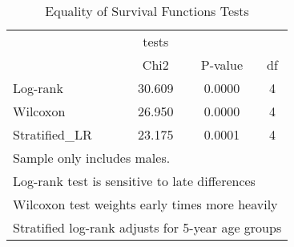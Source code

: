 \begin{table}[htbp]\centering
\caption{Equality of Survival Functions Tests}
\begin{tabular}{l*{3}{c}}
\hline\hline
            &       tests&            &            \\
            &        Chi2&     P-value&          df\\
\hline
Log-rank    &      30.609&      0.0000&           4\\
Wilcoxon    &      26.950&      0.0000&           4\\
Stratified\_LR&      23.175&      0.0001&           4\\
\hline\hline
\multicolumn{4}{l}{\footnotesize Sample only includes males.}\\
\multicolumn{4}{l}{\footnotesize Log-rank test is sensitive to late differences}\\
\multicolumn{4}{l}{\footnotesize Wilcoxon test weights early times more heavily}\\
\multicolumn{4}{l}{\footnotesize Stratified log-rank adjusts for 5-year age groups}\\
\end{tabular}
\end{table}
